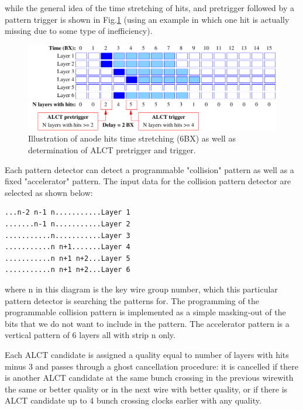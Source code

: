 while the general idea of the time stretching of hits, and pretrigger followed by a pattern trigger is shown in Fig.\ref{fig:anode_stretched_hits} (using an example in which one hit is actually missing due to some type of inefficiency).

\begin{figure}[tbh]
        \begin{center}
                \includegraphics{figures/anode_stretched_hits.pdf}
                \caption{Illustration of anode hits time stretching (6BX) as well as determination of ALCT pretrigger and trigger.}
                \label{fig:anode_stretched_hits}
        \end{center}
\end{figure}

Each pattern detector can detect a programmable "collision" pattern as well as a fixed "accelerator" pattern. The input data for the collision pattern detector are selected as shown below:

\begin{center}
\begin{verbatim}
...n-2 n-1 n...........Layer 1
.......n-1 n...........Layer 2
...........n...........Layer 3
...........n n+1.......Layer 4
...........n n+1 n+2...Layer 5
...........n n+1 n+2...Layer 6
\end{verbatim}
\end{center}

where n in this diagram is the key wire group number, which this particular pattern detector is searching the patterns for. The programming of the programmable collision pattern is implemented as a simple masking-out of the bits that we do not want to include in the pattern. The accelerator pattern is a vertical pattern of 6 layers all with strip n only.

Each ALCT candidate is assigned a quality equal to number of layers with hits minus 3 and passes through a ghost cancellation procedure: it is cancelled if there is another ALCT candidate at the same bunch crossing in the previous wirewith the same or better quality or in the next wire with better quality, or if there is ALCT candidate up to 4 bunch crossing clocks earlier with any quality.


